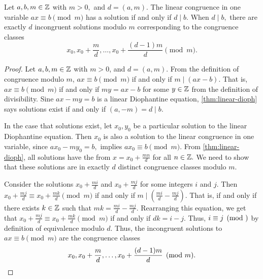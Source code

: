 \documentclass{ximera}
\begin{document}
\begin{theorem}\label{thm:lin-cong-solutions}
	Let $a,b,m\in\mathbb Z$ with $m>0,$ and $d=(a,m)$. The linear congruence in one variable $ax\equiv b\pmod m$ has a solution if and only if $d\mid b$. When $d\mid b,$ there are exactly $d$ incongruent solutions modulo $m$ corresponding to the congruence classes \[x_0, x_0+\frac{m}{d},\dots,x_0+\frac{(d-1)m}{d} \pmod m.\]

	\begin{proof}
		Let $a,b,m\in\mathbb Z$ with $m>0$, and $d=(a,m)$. From the definition of congruence modulo $m$, $ax\equiv b \pmod m$ if and only if $m\mid (ax-b)$. That is, $ax\equiv b \pmod m$ if and only if $my=ax-b$ for some $y\in\mathbb Z$ from the definition of divisibility. Sine $ax-my=b$ is a linear Diophantine equation, \cref{thm:linear-dioph} says solutions exist if and only if $(a,-m)=d\mid b.$
		
		In the case that solutions exist, let $x_0, y_0$ be a particular solution to the linear Diophantine equation. Then $x_0$ is also a solution to the linear congruence in one variable, since $a x_0-my_0=b,$ implies $ax_0\equiv b\pmod m$. From \cref{thm:linear-dioph}, all solutions have the from $x=x_0+\frac{mn}{d}$ for all $n\in\mathbb Z.$  We need to show that these solutions are in exactly $d$ distinct congruence classes modulo $m.$
		
		Consider the solutions $x_0+\frac{mi}{d}$ and $x_0+\frac{mj}{d}$ for some integers $i$ and $j.$ Then $x_0+\frac{mj}{d}\equiv x_0+\frac{mk}{d} \pmod m$ if and only if $m\mid \left(\frac{mi}{d}-\frac{mj}{d}\right).$ That is, if and only if there exists $k\in\mathbb Z$ such that $mk=\frac{mi}{d}-\frac{mj}{d}$. Rearranging this equation, we get that $x_0+\frac{mj}{d}\equiv x_0+\frac{mk}{d} \pmod m$ if and only if $dk=i-j.$ Thus, $i\equiv j\pmod$ by definition of equivalence modulo $d.$ Thus, the incongruent solutions to $ax\equiv b\pmod m$ are the congruence classes \[x_0, x_0+\frac{m}{d},\dots,x_0+\frac{(d-1)m}{d} \pmod m.\qedhere\]
	\end{proof}
\end{theorem}
\end{document}
